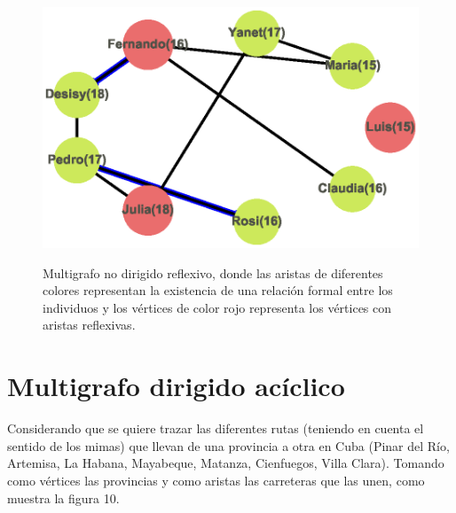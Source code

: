 \documentclass{article}
\begin{document}
\begin{center}

\end{center}
\begin{figure}[h]
\begin{center}
\includegraphics[scale=0.7]{Graf9_circular_layout.eps}\\
\caption{Multigrafo no dirigido reflexivo, donde las aristas de diferentes colores representan la existencia de una relación formal entre los individuos y los vértices de color rojo representa los vértices con aristas reflexivas.}
\end{center}
\end{figure}
\section{Multigrafo dirigido acíclico}
Considerando que se quiere trazar las diferentes rutas (teniendo en cuenta el sentido de los mimas) que llevan de una provincia a otra en Cuba (Pinar del Río, Artemisa, La Habana, Mayabeque, Matanza, Cienfuegos, Villa Clara). Tomando como vértices las provincias y como aristas las carreteras que las unen, como muestra la figura 10.
\end{document}
